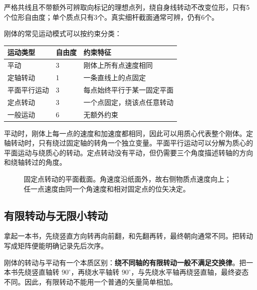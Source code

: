 严格共线且不带额外可辨取向标记的理想点列，绕自身线转动不改变位形，只有5个位形自由度；单个质点只有3个。真实细杆截面通常可辨，仍有6个。

刚体的常见运动模式可以按约束分类：

\begin{center}
\begin{tabular}{lll}
\toprule
运动类型 & 自由度 & 约束特征 \\
\midrule
平动 & 3 & 刚体上所有点速度相同 \\
定轴转动 & 1 & 一条直线上的点固定 \\
平面平行运动 & 3 & 每点始终平行于某一固定平面 \\
定点转动 & 3 & 一个点固定，绕该点任意转动 \\
一般运动 & 6 & 无额外约束 \\
\bottomrule
\end{tabular}
\end{center}

平动时，刚体上每一点的速度和加速度都相同，因此可以用质心代表整个刚体。定轴转动时，只有绕过固定轴的转角一个独立变量。平面平行运动可以分解为质心的平面运动与绕质心的转动。定点转动没有平动，但仍需要三个角度描述转轴的方向和绕轴转过的角度。

\begin{figure}[htbp]
\centering
{}
\caption{固定点转动的平面截面。角速度沿纸面外，故右侧物质点速度向上；任一点速度由同一个角速度和相对固定点的位矢决定。}
\label{fig:rigid-body}
\end{figure}

\subsection{有限转动与无限小转动}

拿起一本书，先绕竖直方向转再向前翻，和先翻再转，最终朝向通常不同。把转动写成矩阵便能明确记录先后次序。

刚体的转动与平动有一个本质区别：\textbf{绕不同轴的有限转动一般不满足交换律}。把一本书先绕竖直轴转 \(90^\circ\)，再绕水平轴转 \(90^\circ\)，与先绕水平轴再绕竖直轴，最终姿态不同。因此，有限转动不能用一个普通的矢量简单相加。

